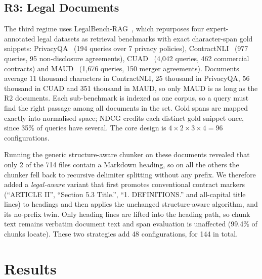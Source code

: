 \documentclass[runningheads]{llncs}
\begin{document}
\subsection{R3: Legal Documents}
\label{sec:r3}
The third regime uses LegalBench-RAG~\cite{pipitone2024legalbenchrag}, which repurposes four expert-annotated legal datasets as retrieval benchmarks with exact character-span gold snippets: PrivacyQA~\cite{ravichander2019privacyqa} (194 queries over 7 privacy policies), ContractNLI~\cite{koreeda2021contractnli} (977 queries, 95 non-disclosure agreements), CUAD~\cite{hendrycks2021cuad} (4,042 queries, 462 commercial contracts) and MAUD~\cite{wang2023maud} (1,676 queries, 150 merger agreements). Documents average 11 thousand characters in ContractNLI, 25 thousand in PrivacyQA, 56 thousand in CUAD and 351 thousand in MAUD, so only MAUD is as long as the R2 documents. Each sub-benchmark is indexed as one corpus, so a query must find the right passage among all documents in the set. Gold spans are mapped exactly into normalised space; NDCG credits each distinct gold snippet once, since 35\% of queries have several. The core design is $4\times2\times3\times4=96$ configurations.

Running the generic structure-aware chunker on these documents revealed that only 2 of the 714 files contain a Markdown heading, so on all the others the chunker fell back to recursive delimiter splitting without any prefix. We therefore added a \emph{legal-aware} variant that first promotes conventional contract markers (``ARTICLE II'', ``Section 5.3 Title.'', ``1. DEFINITIONS.'' and all-capital title lines) to headings and then applies the unchanged structure-aware algorithm, and its no-prefix twin. Only heading lines are lifted into the heading path, so chunk text remains verbatim document text and span evaluation is unaffected (99.4\% of chunks locate). These two strategies add 48 configurations, for 144 in total.

\section{Results}
\label{sec:results}
\end{document}
